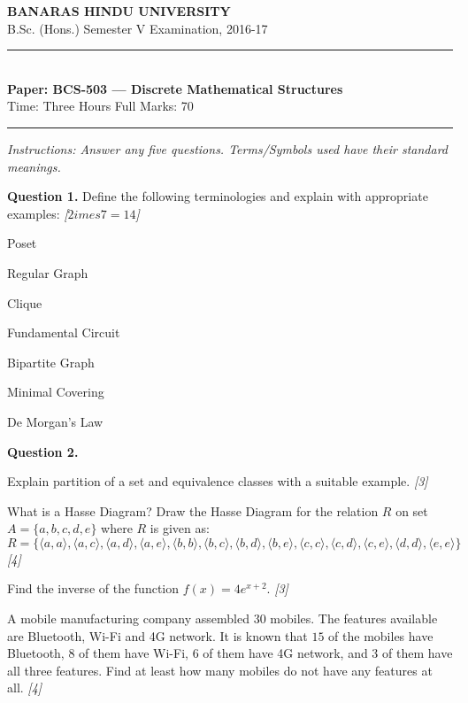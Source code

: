 \documentclass[11pt,a4paper]{article}
\newcommand{\pts}[1]{\hfill   \textit{[#1]}}
\begin{document}
\begin{center}
  {\large\bfseries BANARAS HINDU UNIVERSITY}\\[2pt]
  {\normalsize B.Sc. (Hons.) Semester V Examination, 2016-17}\\[6pt]
  \rule{0.8\linewidth}{0.5pt}\\[6pt]
  {\large\bfseries Paper: BCS-503 --- Discrete Mathematical Structures}\\[4pt]
  {\normalsize Time: Three Hours \hfill Full Marks: 70}
\end{center}

\rule{\linewidth}{0.4pt}

\smallskip



\noindent   \textit{Instructions: Answer any five questions. Terms/Symbols used have their standard meanings.}

\bigskip

\medskip


\noindent   \textbf{Question 1.} Define the following terminologies and explain with appropriate examples: \pts{$2 imes7=14$}

\begin{parts}
  \item Poset
  \item Regular Graph
  \item Clique
  \item Fundamental Circuit
  \item Bipartite Graph
  \item Minimal Covering
  \item De Morgan's Law
\end{parts}

\medskip


\noindent   \textbf{Question 2.}

\begin{parts}
  \item Explain partition of a set and equivalence classes with a suitable example. \pts{3}
  \item What is a Hasse Diagram? Draw the Hasse Diagram for the relation $R$ on set $A = \{a, b, c, d, e\}$ where $R$ is given as:
  \[ R = \{\langle a, a \rangle, \langle a, c \rangle, \langle a, d \rangle, \langle a, e \rangle, \langle b, b \rangle, \langle b, c \rangle, \langle b, d \rangle, \langle b, e \rangle, \langle c, c \rangle, \langle c, d \rangle, \langle c, e \rangle, \langle d, d \rangle, \langle e, e \rangle\} \] \pts{4}
  \item Find the inverse of the function $f(x) = 4e^{x+2}$. \pts{3}
  \item A mobile manufacturing company assembled $30$ mobiles. The features available are Bluetooth, Wi-Fi and 4G network. It is known that $15$ of the mobiles have Bluetooth, $8$ of them have Wi-Fi, $6$ of them have 4G network, and $3$ of them have all three features. Find at least how many mobiles do not have any features at all. \pts{4}
\end{parts}
\end{document}
